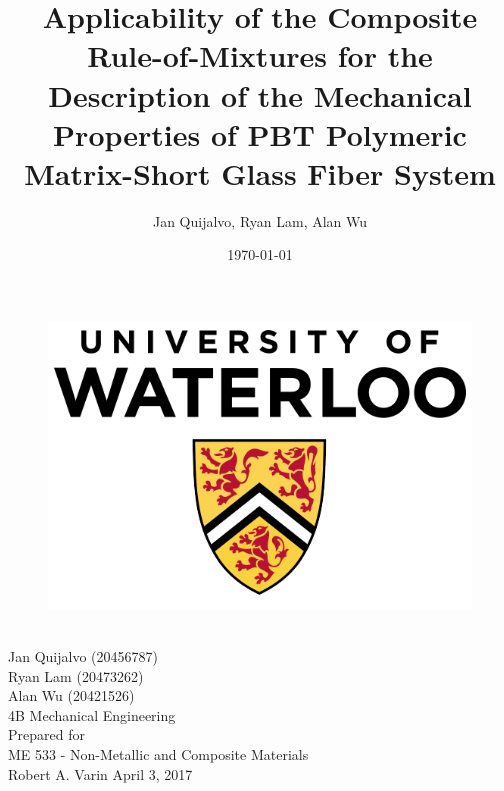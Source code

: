 \documentclass[11pt]{article}
\begin{document}
\doublespacing

\title{\textbf{Applicability of the Composite Rule-of-Mixtures for the Description of the Mechanical Properties of PBT Polymeric Matrix-Short Glass Fiber System}}
\author{Jan Quijalvo, Ryan Lam, Alan Wu}
\date{\today}


\makeatletter
    \singlespacing
    \begin{titlepage}
        \begin{center}
        	\begin{figure}[h]
        	\centering
            \includegraphics[scale=0.3]{./figures/University-of-Waterloo}
            \end{figure}
            \vspace{20mm}
            {\huge \bfseries  \@title }\\[2ex] 
            \vspace{5mm}
            {\LARGE Jan Quijalvo (20456787)}\\
            \vspace{2mm}
            {\LARGE Ryan Lam (20473262)}\\
            \vspace{2mm}
            {\LARGE Alan Wu (20421526)}\\
            \vspace{2mm}
            \LARGE 4B Mechanical Engineering\\[12ex]
            Prepared for\\
            ME 533 - Non-Metallic and Composite Materials\\
            Robert A. Varin
            \centering
            \vfill
            {\large April 3, 2017}
        \end{center}
    \end{titlepage}
\makeatother
\end{document}
